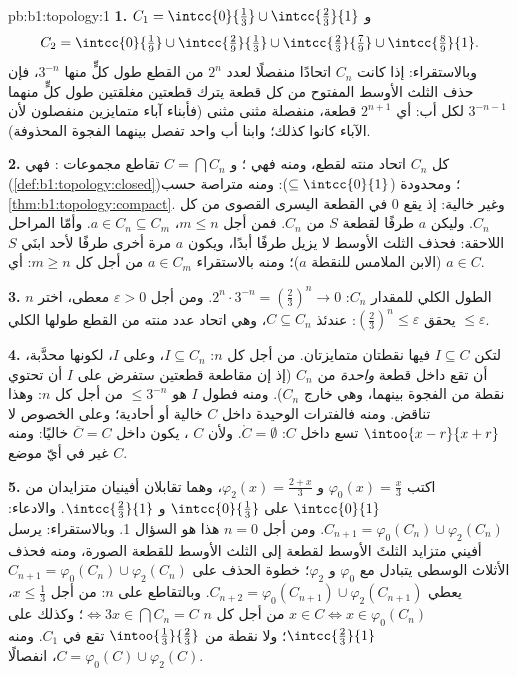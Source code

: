 \begin{solution}{pb:b1:topology:1}
\textbf{1.} $C_1 = \intcc{0}{\frac13} \cup \intcc{\frac23}{1}$
و
\[
C_2 = \intcc{0}{\tfrac19} \cup \intcc{\tfrac29}{\tfrac13}
\cup \intcc{\tfrac23}{\tfrac79} \cup \intcc{\tfrac89}{1} .
\]
وبالاستقراء: إذا كانت $C_n$ اتحادًا منفصلًا لعدد $2^n$ من القطع 
طول كلٍّ منها $3^{-n}$، فإن حذف الثلث الأوسط المفتوح من كل قطعة
يترك قطعتين مغلقتين طول كلٍّ منهما $3^{-n-1}$ لكل أب:
أي $2^{n+1}$ قطعة، منفصلة مثنى مثنى (فأبناء آباء متمايزين
منفصلون لأن الآباء كانوا كذلك؛ وابنا أب
واحد تفصل بينهما الفجوة المحذوفة).

\textbf{2.} كل $C_n$ اتحاد منته لقطع، ومنه فهي
؛ و $C = \bigcap C_n$ تقاطع مجموعات :
فهي  (\cref{def:b1:topology:closed})؛ ومحدودة ($\subseteq
\intcc{0}{1}$): ومنه متراصة حسب \cref{thm:b1:topology:compact}.
وغير خالية: إذ يقع $0$ في القطعة اليسرى القصوى من كل $C_n$. وليكن
$a$ طرفًا لقطعة $S$ من $C_n$. فمن أجل $m \leq n$،
$a \in C_n \subseteq C_m$. وأمّا المراحل اللاحقة: فحذف الثلث
الأوسط لا يزيل طرفًا أبدًا، ويكون $a$ مرة أخرى طرفًا
لأحد ابنَي $S$ (الابن الملامس للنقطة $a$)؛ ومنه
بالاستقراء $a \in C_m$ من أجل كل $m \geq n$: أي $a \in C$.

\textbf{3.} الطول الكلي للمقدار $C_n$: $2^n \cdot 3^{-n} =
(\frac23)^n \to 0$. ومن أجل $\varepsilon > 0$ معطى، اختر $n$ يحقق
$(\frac23)^n \leq \varepsilon$: عندئذ $C \subseteq C_n$، وهي اتحاد
عدد منته من القطع طولها الكلي $\leq \varepsilon$.

\textbf{4.} لتكن $I \subseteq C$  فيها نقطتان
متمايزتان. من أجل كل $n$: $I \subseteq C_n$، وعلى $I$، لكونها محدَّبة،
أن تقع داخل قطعة \emph{واحدة} من $C_n$ (إذ إن مقاطعة قطعتين
ستفرض على $I$ أن تحتوي نقطة من الفجوة بينهما،
وهي خارج $C_n$). ومنه فطول $I$ هو $\leq
3^{-n}$ من أجل كل $n$: وهذا تناقض. ومنه فالفترات الوحيدة
داخل $C$ خالية أو أحادية؛ وعلى الخصوص لا
$\intoo{x-r}{x+r}$ تسع داخل $C$: $\mathring C = \emptyset$.
ولأن $C$ ، يكون داخل $\overline C = C$ خاليًا: ومنه  $C$
غير  في أيّ موضع.

\textbf{5.} اكتب $\varphi_0(x) = \frac x3$ و $\varphi_2(x) =
\frac{2 + x}{3}$، وهما تقابلان أفينيان متزايدان من $\intcc{0}{1}$
على $\intcc{0}{\frac13}$ و $\intcc{\frac23}{1}$. والادعاء:
$C_{n+1} = \varphi_0(C_n) \cup \varphi_2(C_n)$. ومن أجل $n = 0$ هذا
هو السؤال 1. وبالاستقراء: يرسل  أفيني متزايد
الثلثَ الأوسط لقطعة إلى الثلث الأوسط للقطعة
الصورة، ومنه فحذف الأثلاث الوسطى يتبادل مع $\varphi_0$ و
$\varphi_2$؛  خطوة الحذف على $C_{n+1} =
\varphi_0(C_n) \cup \varphi_2(C_n)$ يعطي $C_{n+2} =
\varphi_0(C_{n+1}) \cup \varphi_2(C_{n+1})$. وبالتقاطع على
$n$: من أجل $x \leq \frac13$، $x \in C \iff x \in \varphi_0(C_n)$
من أجل كل $n$ $\iff 3x \in \bigcap C_n = C$؛ وكذلك على
$\intcc{\frac23}{1}$؛ ولا نقطة من $\intoo{\frac13}{\frac23}$
تقع في $C_1$. ومنه $C = \varphi_0(C) \cup \varphi_2(C)$،
انفصالًا.


\end{solution}

